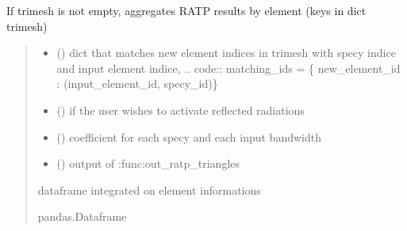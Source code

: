 \documentclass[letterpaper,10pt,english]{sphinxmanual}
\begin{document}

\begin{fulllineitems}
\label{\detokenize{reference:outputs.out_ratp_elements}}
\pysigstartsignatures
{}
\pysigstopsignatures
\sphinxAtStartPar
If trimesh is not empty, aggregates RATP results by element (keys in dict trimesh)
\begin{quote}\begin{description}
\begin{itemize}
\item {} 
\sphinxAtStartPar
{} () \textendash{} dict that matches new element indices in trimesh with specy indice and
input element indice, 
.. code:: matching\_ids = \{ new\_element\_id : (input\_element\_id, specy\_id)\}

\item {} 
\sphinxAtStartPar
{} () \textendash{} if the user wishes to activate reflected radiations

\item {} 
\sphinxAtStartPar
{} () \textendash{} coefficient for each specy and each input bandwidth

\item {} 
\sphinxAtStartPar
{} () \textendash{} output of :func:out\_ratp\_triangles

\end{itemize}

\sphinxAtStartPar
dataframe integrated on element informations

\sphinxAtStartPar
pandas.Dataframe

\end{description}\end{quote}

\end{fulllineitems}
\end{document}
